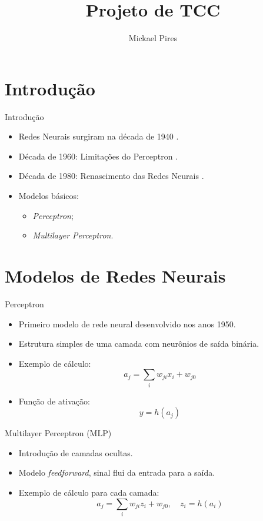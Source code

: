 \documentclass[11pt]{beamer}
\begin{document}
	\author{Mickael Pires}
	\title{Projeto de TCC}
	
	\frame{\titlepage}
	
	\section{Introdução}
	\begin{frame}{Introdução}
		\begin{itemize}
			\item Redes Neurais surgiram na década de 1940 \cite{Geron2021}.
			\item Década de 1960: Limitações do Perceptron \cite{minsky1969introduction}.
			\item Década de 1980: Renascimento das Redes Neurais \cite{alexander2020}.
			\item Modelos básicos:
			\begin{itemize}
				\item \textit{Perceptron};
				\item \textit{Multilayer Perceptron}.
			\end{itemize}
		\end{itemize}
	\end{frame}
	
	\section{Modelos de Redes Neurais}
	\begin{frame}{Perceptron}
		\begin{itemize}
			\item Primeiro modelo de rede neural desenvolvido nos anos 1950.
			\item Estrutura simples de uma camada com neurônios de saída binária.
			\item Exemplo de cálculo:
			\begin{equation}
				a_j = \sum_i w_{ji} x_i + w_{j0}
			\end{equation}
			\item Função de ativação:
			\begin{equation}
				y = h(a_j)
			\end{equation}
		\end{itemize}
	\end{frame}
	
	\begin{frame}{Multilayer Perceptron (MLP)}
		\begin{itemize}
			\item Introdução de camadas ocultas.
			\item Modelo \textit{feedforward}, sinal flui da entrada para a saída.
			\item Exemplo de cálculo para cada camada:
			\begin{equation}
				a_j = \sum_i w_{ji} z_i + w_{j0}, \quad z_i = h(a_i)
			\end{equation}
		\end{itemize}
	\end{frame}
	
\end{document}
